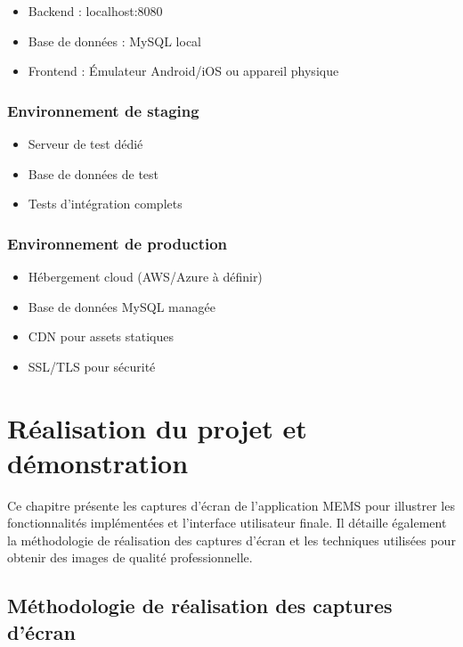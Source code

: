 \documentclass[a4paper,11pt]{report}
\begin{document}
\begin{itemize}
    \item Backend : localhost:8080
    \item Base de données : MySQL local
    \item Frontend : Émulateur Android/iOS ou appareil physique
\end{itemize}

\subsection{Environnement de staging}

\begin{itemize}
    \item Serveur de test dédié
    \item Base de données de test
    \item Tests d'intégration complets
\end{itemize}

\subsection{Environnement de production}

\begin{itemize}
    \item Hébergement cloud (AWS/Azure à définir)
    \item Base de données MySQL managée
    \item CDN pour assets statiques
    \item SSL/TLS pour sécurité
\end{itemize}

\chapter{Réalisation du projet et démonstration}

Ce chapitre présente les captures d'écran de l'application MEMS pour illustrer les fonctionnalités implémentées et l'interface utilisateur finale. Il détaille également la méthodologie de réalisation des captures d'écran et les techniques utilisées pour obtenir des images de qualité professionnelle.

\section{Méthodologie de réalisation des captures d'écran}
\end{document}
